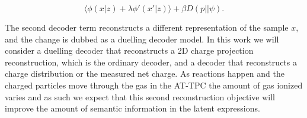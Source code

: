 \begin{equation}\label{eq:duelling_decoder}
\langle\phi(x|z) + \lambda\phi'(x'|z) \rangle + \beta D(p || \psi).
\end{equation}

\noindent The second decoder term reconstructs a different representation of the sample $x$, and the change is dubbed as a duelling decoder model. In this work we will consider a duelling decoder that reconstructs a 2D charge projection reconstruction, which is the ordinary decoder, and a decoder that reconstructs a charge distribution or the measured net charge. As reactions happen and the charged particles move through the gas in the AT-TPC the amount of gas ionized varies and as such we expect that this second reconstruction objective will improve the amount of semantic information in the latent expressions.

